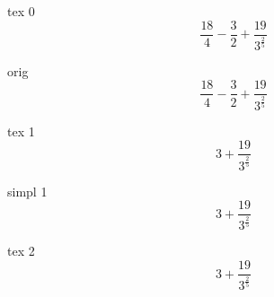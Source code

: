 \documentclass[a4paper, 12pt]{article}
\begin{document}
                          
tex 0 \[ {{ \frac {{18}} {{4}} -  \frac {{3}} {{2}}} +  \frac {{19}} {{{3} ^  \frac {{2}} {{5}}}}} \]

orig \[ {{ \frac {{18}} {{4}} -  \frac {{3}} {{2}}} +  \frac {{19}} {{{3} ^  \frac {{2}} {{5}}}}} \]

tex 1 \[ {{3} +  \frac {{19}} {{{3} ^  \frac {{2}} {{5}}}}} \]

simpl 1 \[ {{3} +  \frac {{19}} {{{3} ^  \frac {{2}} {{5}}}}} \]

tex 2 \[ {{3} +  \frac {{19}} {{{3} ^  \frac {{2}} {{5}}}}} \]
\end{document}
